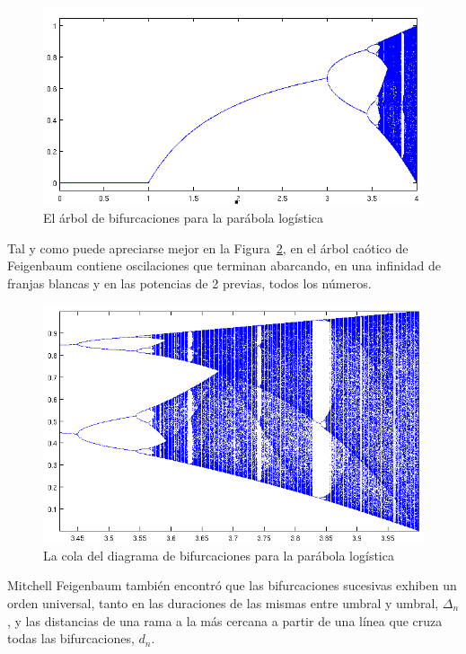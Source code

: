 \documentclass[letterpaper, 11pt, oneside]{article}
\theoremstyle{definition}
\theoremstyle{remark}
\begin{document}
\begin{itemize}
\begin{figure}[ht]
	\begin{center}
		\includegraphics[width=12cm]{Imagenes/bifur_logistica.png}
	\end{center}
	\caption{El árbol de bifurcaciones para la parábola logística}
	\label{bifur_logistica}
\end{figure}

Tal y como puede apreciarse mejor en la Figura~\ref{bifur_logistica_espacios}, en el árbol caótico de Feigenbaum contiene oscilaciones que terminan abarcando, en una infinidad de franjas blancas y en las potencias de 2 previas, todos los números.

\begin{figure}[ht]
	\begin{center}
		\includegraphics[width=12cm]{Imagenes/bifur_logistica_espacios.png}
	\end{center}
	\caption{La cola del diagrama de bifurcaciones para la parábola logística}
	\label{bifur_logistica_espacios}
\end{figure}

Mitchell Feigenbaum también encontró que las bifurcaciones sucesivas exhiben un orden universal, tanto en las duraciones de las mismas entre umbral y umbral, $\Delta_n$, y las distancias de una rama a la más cercana a partir de una línea que cruza todas las bifurcaciones, $d_n$.


\end{itemize}
\end{document}
